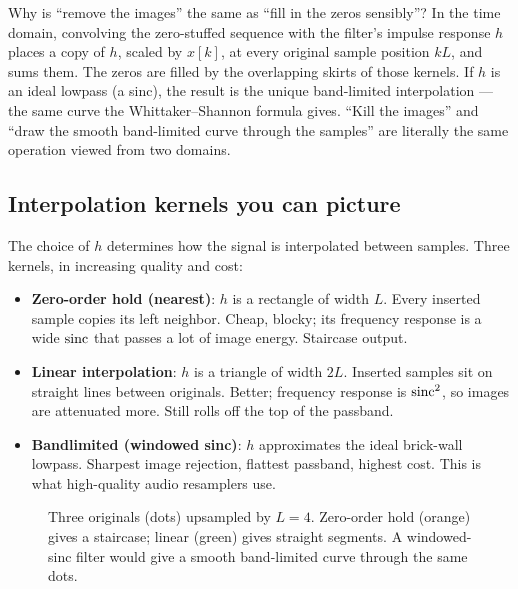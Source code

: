 \begin{whybox}
Why is ``remove the images'' the same as ``fill in the zeros sensibly''? In the
time domain, convolving the zero-stuffed sequence with the filter's impulse
response $h$ places a copy of $h$, scaled by $x[k]$, at every original sample
position $kL$, and sums them. The zeros are filled by the overlapping skirts of
those kernels. If $h$ is an ideal lowpass (a sinc), the result is the unique
band-limited interpolation --- the same curve the Whittaker--Shannon formula
gives. ``Kill the images'' and ``draw the smooth band-limited curve through the
samples'' are literally the same operation viewed from two domains.
\end{whybox}

\subsection{Interpolation kernels you can picture}

The choice of $h$ determines how the signal is interpolated between samples. Three kernels, in increasing quality and cost:
\begin{itemize}
  \item \textbf{Zero-order hold (nearest)}: $h$ is a rectangle of width $L$. Every
  inserted sample copies its left neighbor. Cheap, blocky; its frequency response
  is a wide $\operatorname{sinc}$ that passes a lot of image energy. Staircase output.
  \item \textbf{Linear interpolation}: $h$ is a triangle of width $2L$. Inserted
  samples sit on straight lines between originals. Better; frequency response is
  $\operatorname{sinc}^2$, so images are attenuated more. Still rolls off the top of the
  passband.
  \item \textbf{Bandlimited (windowed sinc)}: $h$ approximates the ideal
  brick-wall lowpass. Sharpest image rejection, flattest passband, highest cost.
  This is what high-quality audio resamplers use.
\end{itemize}

\begin{figure}[htbp]
\centering
{}
\caption{Three originals (dots) upsampled by $L=4$. Zero-order hold (orange)
gives a staircase; linear (green) gives straight segments. A windowed-sinc filter
would give a smooth band-limited curve through the same dots.}
\label{ch22:fig-kernels}
\end{figure}

